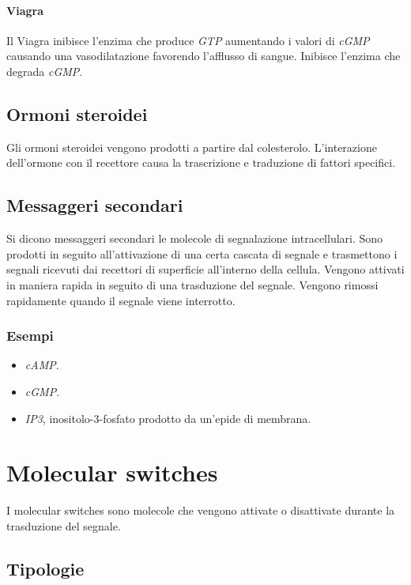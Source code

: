 			\paragraph{Viagra}
			Il Viagra inibisce l'enzima che produce \emph{GTP} aumentando i valori di \emph{cGMP} causando una vasodilatazione favorendo l'afflusso di sangue.
			Inibisce l'enzima che degrada \emph{cGMP}.

	\subsection{Ormoni steroidei}
	Gli ormoni steroidei vengono prodotti a partire dal colesterolo.
	L'interazione dell'ormone con il recettore causa la trascrizione e traduzione di fattori specifici.

	\subsection{Messaggeri secondari}
	Si dicono messaggeri secondari le molecole di segnalazione intracellulari.
	Sono prodotti in seguito all'attivazione di una certa cascata di segnale e trasmettono i segnali ricevuti dai recettori di superficie all'interno della cellula.
	Vengono attivati in maniera rapida in seguito di una trasduzione del segnale.
	Vengono rimossi rapidamente quando il segnale viene interrotto.

		\subsubsection{Esempi}
		\begin{multicols}{2}
			\begin{itemize}
				\item \emph{cAMP}.
				\item \emph{cGMP}.
				\item \emph{IP3}, inositolo-3-fosfato prodotto da un'epide di membrana.
			\end{itemize}
		\end{multicols}

\section{Molecular switches}
I molecular switches sono molecole che vengono attivate o disattivate durante la trasduzione del segnale.

	\subsection{Tipologie}

